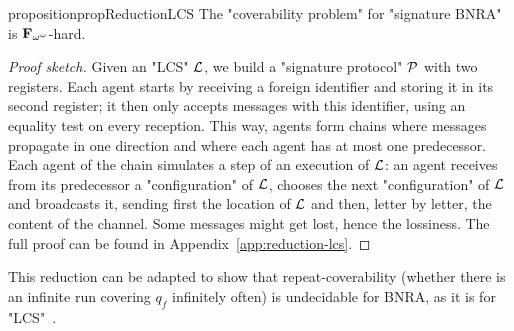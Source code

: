 \begin{restatable}{proposition}{propReductionLCS}
	\label{prop:reduction-LCS}
	The "coverability problem" for "signature BNRA" is $\mathbf{F}_{\omega^\omega}$-hard.
\end{restatable}
\begin{proof}[Proof sketch]
Given an "LCS" $\mathcal{L}$, we build a "signature protocol" $\mathcal{P}$ with two registers. 
Each agent starts by receiving a foreign identifier and storing it in its second register; it then only accepts messages with this identifier, using an equality test on every reception.
 This way, agents form chains where messages propagate in one direction and where each agent has at most one predecessor. 
 Each agent of the chain simulates a step of an execution of $\mathcal{L}$: an agent receives from its predecessor a "configuration" of $\mathcal{L}$, chooses the next "configuration" of $\mathcal{L}$ and broadcasts it, sending first the location of $\mathcal{L}$ and then, letter by letter, the content of the channel. 
 Some messages might get lost, hence the lossiness. 
 The full proof can be found in Appendix~\ref{app:reduction-lcs}. 
\end{proof}



\begin{remark}
	This reduction can be adapted to show that repeat-coverability (whether there is an infinite run covering $q_f$ infinitely often) is undecidable for BNRA, as it is for "LCS"~\cite{AbdullaJ1996undec}. 
\end{remark}

